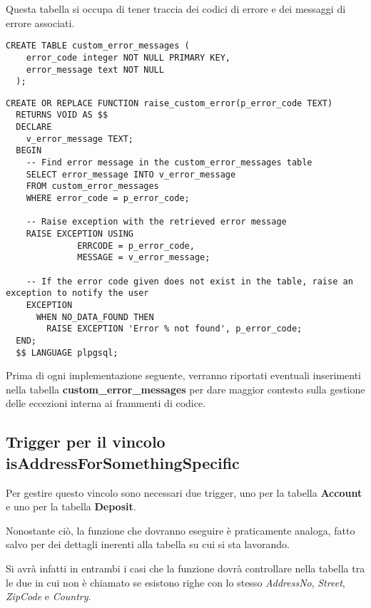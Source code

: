 Questa tabella si occupa di tener traccia dei codici di errore e dei messaggi di errore associati.

\begin{lstlisting}[caption={Creazione della tabella \textbf{custom\_error\_messages}}]
  CREATE TABLE custom_error_messages (
    error_code integer NOT NULL PRIMARY KEY,
    error_message text NOT NULL
  );
\end{lstlisting}

\begin{lstlisting}[caption={Creazione della funzione per gestire le eccezioni}]
  CREATE OR REPLACE FUNCTION raise_custom_error(p_error_code TEXT)
  RETURNS VOID AS $$
  DECLARE
    v_error_message TEXT;
  BEGIN
    -- Find error message in the custom_error_messages table 
    SELECT error_message INTO v_error_message
    FROM custom_error_messages
    WHERE error_code = p_error_code;
  
    -- Raise exception with the retrieved error message
    RAISE EXCEPTION USING 
              ERRCODE = p_error_code, 
              MESSAGE = v_error_message;
    
    -- If the error code given does not exist in the table, raise an exception to notify the user
    EXCEPTION
      WHEN NO_DATA_FOUND THEN
        RAISE EXCEPTION 'Error % not found', p_error_code;
  END;
  $$ LANGUAGE plpgsql;
\end{lstlisting}

Prima di ogni implementazione seguente, verranno riportati eventuali inserimenti nella tabella \textbf{custom\_error\_messages} per dare maggior contesto sulla gestione delle eccezioni interna ai frammenti di codice.

\subsection{Trigger per il vincolo \textbf{isAddressForSomethingSpecific}}

Per gestire questo vincolo sono necessari due trigger, uno per la tabella \textbf{Account} e uno per la tabella \textbf{Deposit}.

Nonostante ciò, la funzione che dovranno eseguire è praticamente analoga, fatto salvo per dei dettagli inerenti alla tabella su cui si sta lavorando.

Si avrà infatti in entrambi i casi che la funzione dovrà controllare nella tabella tra le due in cui non è chiamato se esistono righe con lo stesso \textit{AddressNo}, \textit{Street}, \textit{ZipCode} e \textit{Country}.

